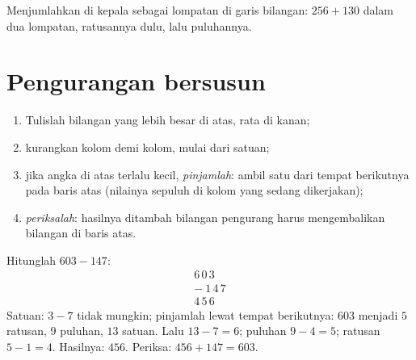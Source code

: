 \begin{omfigure}

{\small Menjumlahkan di kepala sebagai lompatan di garis bilangan:
$256 + 130$ dalam dua lompatan, ratusannya dulu, lalu puluhannya.}
\end{omfigure}

\section{Pengurangan bersusun}

\begin{method}\label{met:g3:addsub:sub}
\begin{enumerate}
  \item Tulislah bilangan yang lebih besar di atas, rata di kanan;
  \item kurangkan kolom demi kolom, mulai dari satuan;
  \item jika angka di atas terlalu kecil, \emph{pinjamlah}: ambil
        satu dari tempat berikutnya pada baris atas (nilainya
        sepuluh di kolom yang sedang dikerjakan);
  \item \emph{periksalah}: hasilnya ditambah bilangan pengurang
        harus mengembalikan bilangan di baris atas.
\end{enumerate}
\end{method}

\begin{example}\label{ex:g3:addsub:sub}
Hitunglah $603 - 147$:
\[
\begin{array}{r}
6\,0\,3 \\
-\ 1\,4\,7 \\
\hline
4\,5\,6
\end{array}
\]
Satuan: $3 - 7$ tidak mungkin; pinjamlah lewat tempat berikutnya:
$603$ menjadi $5$ ratusan, $9$ puluhan, $13$ satuan. Lalu
$13 - 7 = 6$; puluhan $9 - 4 = 5$; ratusan $5 - 1 = 4$. Hasilnya:
$456$. Periksa: $456 + 147 = 603$.
\end{example}

